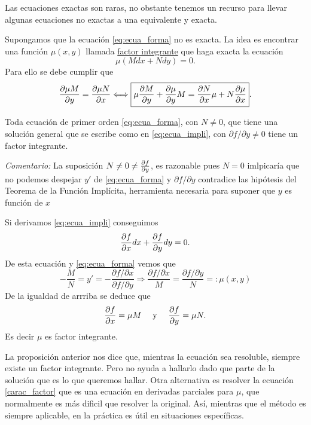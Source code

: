  Las ecuaciones exactas son raras, no obstante tenemos un recurso para llevar algunas ecuaciones no exactas a una equivalente y exacta.

 Supongamos que la ecuación  \eqref{eq:ecua_forma} no es  exacta. La idea es encontrar una función $\mu(x,y)$ llamada
\href{http://es.wikipedia.org/wiki/Ecuación_diferencial_exacta\#Factor_integrante.}{factor integrante} que haga exacta la ecuación
\[\mu\left(Mdx+Ndy\right)=0.\]
 Para ello se debe cumplir que
\begin{equation}\label{carac_factor}
  \der{\mu M}{y}=\der{\mu N}{x}\Longleftrightarrow \boxed{ \mu\der{M}{y}+\der{\mu}{y}M=\der{N}{x}\mu+N\der{\mu}{x}}.
\end{equation}

\begin{proposicion} Toda ecuación de primer
 orden \eqref{eq:ecua_forma}, con $N\neq 0$,  que tiene una solución general
que se escribe como en \eqref{eq:ecua_impli}, con $\partial f/\partial y\neq 0
$  tiene un factor integrante.
\end{proposicion}
\noindent\textit{Comentario:} La suposición $N\neq 0 \neq\der{f}{y}$,  es razonable pues $N=0$ imlpicaría que no podemos despejar $y'$ de \eqref{eq:ecua_forma}  y $\partial f/\partial y$ contradice las hipótesis del Teorema de la Función Implícita, herramienta necesaria para suponer que $y$ es función de $x$

\begin{demo} Si derivamos \eqref{eq:ecua_impli} conseguimos
\[\der{f}{x}dx+\der{f}{y}dy=0.\]
De esta ecuación y \eqref{eq:ecua_forma}  vemos que
\[-\frac{M}{N}=y'=-\frac{\partial f /\partial x}{\partial f/\partial y}\Longrightarrow \frac{ \partial f /\partial x}{M}=\frac{ \partial f/\partial y}{N}=:\mu(x,y)\]
 De la igualdad de arrriba se deduce que
\[\der{f}{x}=\mu M\quad\text{ y }\quad \der{f}{y}=\mu N.\]
Es decir $\mu$ es factor integrante.
\end{demo}

La proposición anterior nos dice que, mientras la ecuación sea resoluble, siempre  existe un factor integrante. Pero no ayuda a hallarlo dado que parte de la solución que es lo que queremos hallar. Otra alternativa es resolver la ecuación \eqref{carac_factor} que es una ecuación en derivadas parciales para $\mu$, que normalmente es más dificil que resolver  la original. Así, mientras que el método es siempre aplicable, en la práctica es útil en situaciones específicas.


